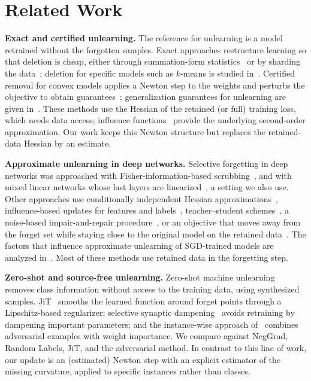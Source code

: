 \documentclass[10pt,twocolumn,letterpaper]{article}
\begin{document}
\section{Related Work}
\label{sec:related_work}
\noindent\textbf{Exact and certified unlearning.} The reference for unlearning is a model retrained without the forgotten samples. Exact approaches restructure learning so that deletion is cheap, either through summation-form statistics~\cite{cao2015towards} or by sharding the data~\cite{bourtoule2021machine}; deletion for specific models such as $k$-means is studied in~\cite{ginart2019making}. Certified removal for convex models applies a Newton step to the weights and perturbs the objective to obtain guarantees~\cite{guo2020certified}; generalization guarantees for unlearning are given in~\cite{sekhari2021remember}. These methods use the Hessian of the retained (or full) training loss, which needs data access; influence functions~\cite{koh2017understanding} provide the underlying second-order approximation. Our work keeps this Newton structure but replaces the retained-data Hessian by an estimate.

\noindent\textbf{Approximate unlearning in deep networks.} Selective forgetting in deep networks was approached with Fisher-information-based scrubbing~\cite{golatkar2020eternal}, and with mixed linear networks whose last layers are linearized~\cite{golatkar2021mixed}, a setting we also use. Other approaches use conditionally independent Hessian approximations~\cite{mehta2022deep}, influence-based updates for features and labels~\cite{warnecke2023machine}, teacher--student schemes~\cite{chundawat2023can}, a noise-based impair-and-repair procedure~\cite{tarun2023fast}, or an objective that moves away from the forget set while staying close to the original model on the retained data~\cite{kurmanji2023towards}. The factors that influence approximate unlearning of SGD-trained models are analyzed in~\cite{thudi2022unrolling}. Most of these methods use retained data in the forgetting step.

\noindent\textbf{Zero-shot and source-free unlearning.} Zero-shot machine unlearning~\cite{chundawat2023zero} removes class information without access to the training data, using synthesized samples. JiT~\cite{foster2024information} smooths the learned function around forget points through a Lipschitz-based regularizer; selective synaptic dampening~\cite{foster2024fast} avoids retraining by dampening important parameters; and the instance-wise approach of~\cite{cha2024learning} combines adversarial examples with weight importance. We compare against NegGrad, Random Labels, JiT, and the adversarial method. In contrast to this line of work, our update is an (estimated) Newton step with an explicit estimator of the missing curvature, applied to specific instances rather than classes.
\end{document}
